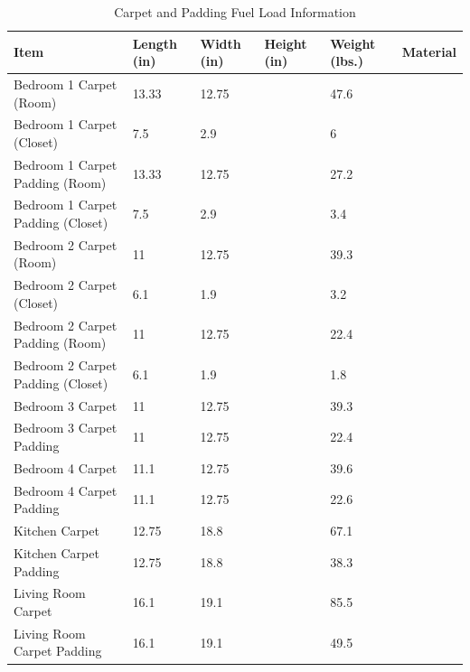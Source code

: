 \begin{table}[H]
\centering
\begin{tabular}{|L{0.23\textwidth}|C{0.08\textwidth}|C{0.08\textwidth}|C{0.08\textwidth}|C{0.08\textwidth}|L{0.25\textwidth}|}
\hline
Item 								&Length (in) 	&Width (in) 	&Height (in) 	&Weight (lbs.) 	&Material \\ \hline \hline
Bedroom 1 Carpet (Room) 			&13.33			&12.75			&				&47.6			& \\ \hline
Bedroom 1 Carpet (Closet)			&7.5			&2.9			&				&6				& \\ \hline
Bedroom 1 Carpet Padding (Room)		&13.33			&12.75			&				&27.2			& \\ \hline
Bedroom 1 Carpet Padding (Closet)	&7.5			&2.9			&				&3.4			& \\ \hline	 	 
Bedroom 2 Carpet (Room) 			&11				&12.75			&				&39.3			& \\ \hline
Bedroom 2 Carpet (Closet)			&6.1			&1.9			&				&3.2			& \\ \hline
Bedroom 2 Carpet Padding (Room)		&11				&12.75			&				&22.4			& \\ \hline
Bedroom 2 Carpet Padding (Closet)	&6.1			&1.9			&				&1.8			& \\ \hline	  
Bedroom 3 Carpet 					&11				&12.75			&				&39.3			& \\ \hline
Bedroom 3 Carpet Padding 			&11				&12.75			&				&22.4			& \\ \hline	 
Bedroom 4 Carpet 					&11.1			&12.75			&				&39.6			& \\ \hline
Bedroom 4 Carpet Padding 			&11.1			&12.75			&				&22.6			& \\ \hline	 
Kitchen Carpet 						&12.75			&18.8			&				&67.1			& \\ \hline
Kitchen Carpet Padding 				&12.75			&18.8			&				&38.3			& \\ \hline	 
Living Room Carpet					&16.1			&19.1			&				&85.5			& \\ \hline
Living Room Carpet Padding 			&16.1			&19.1			&				&49.5			& \\ \hline	
\end{tabular}
\caption{Carpet and Padding Fuel Load Information}
\label{table:carpet_padding_fuel_weights}
\end{table}

